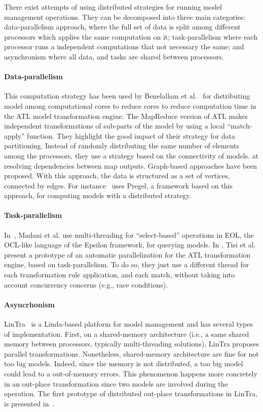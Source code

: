 
\begin{multicols}{2}
There exist attempts of using distributed strategies for running model management
operations. They can be decomposed into three main categories: data-parallelism approach,
where the full set of data is split among different processors which applies the same
computation on it; task-parallelism where each processor runs a independent computations 
that not necessary the same; and asynchronism where all data, and tasks are shared between 
processors.

\paragraph{Data-parallelism}
This computation strategy has been used by Benelallam et al.~\cite{BenelallamGTC2015:SLE}
for distributing model among computational cores to reduce cores to reduce computation time
in the ATL model transformation engine. The MapReduce version of ATL makes independent
transformations of sub-parts of the model by using a local “match-apply” function. They
highlight the good impact of their strategy for data partitioning. Instead of randomly
distributing the same number of elements among the processors, they use a strategy based
on the connectivity of models. at resolving dependencies between map outputs. Graph-based
approaches have been proposed. With this approach, the data is structured as a set of
vertices, connected by edges. For instance~\cite{Krause2014:FASE} uses Pregel, a framework
based on this approach, for computing models with a distributed strategy.

\paragraph{Task-parallelism}
In~\cite{MadaniKP2019:JOT}, Madani et al. use multi-threading for “select-based” operations
in EOL, the OCL-like language of the Epsilon framework, for querying models. In
\cite{TisiPC2013:MODELS}, Tisi et al. present a prototype of an automatic parallelization
for the ATL transformation engine, based on task-parallelism. To do so, they just use a
different thread for each transformation rule application, and each match, without taking
into account concurrency concerns (e.g., race conditions).

\paragraph{Asyncrhonism}
LinTra~\cite{BurguenoTWV2015:STAF} is a Linda-based platform for model management and has
several types of implementation. First, on a shared-memory architecture (i.e., a same shared
memory between processors, typically multi-threading solutions), LinTra proposes parallel 
transformations. Nonetheless, shared-memory architecture are fine for not too big models. 
Indeed, since the memory is not distributed, a too big model could lead to a out-of-memory 
errors. This phenomenon happens more concretely in an out-place transformation since two
models are involved during the operation. The first prototype of distributed out-place
transformations in LinTra, is presented in~\cite{BurguenoWV2016:INFSOF}.

\end{multicols}